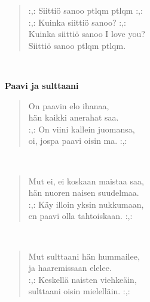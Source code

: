 \noindent\begin{minipage}{\linewidth}
\begin{verse}
	\hspace{0pt-\widthof{:,: }}:,: Siittiö sanoo ptlqm ptlqm :,:\\
	\hspace{0pt-\widthof{:,: }}:,: Kuinka siittiö sanoo? :,:\\
	Kuinka siittiö sanoo I love you?\\
	Siittiö sanoo ptlqm ptlqm.\\
\end{verse}
\end{minipage}\\[10pt]
%
%
\noindent\begin{minipage}{\linewidth}
\vspace{5pt}
\parbox[t]{0.85\linewidth}{\raggedright {\large\bf Paavi ja sulttaani}\\[6pt]}
\begin{verse}
	On paavin elo ihanaa,\\
	hän kaikki anerahat saa.\\
	\hspace{0pt-\widthof{:,: }}:,: On viini kallein juomansa,\\
	oi, jospa paavi oisin ma. :,:\\
\end{verse}
\end{minipage}\\[10pt]
\noindent\begin{minipage}{\linewidth}
\begin{verse}
	Mut ei, ei koskaan maistaa saa,\\
	hän nuoren naisen suudelmaa.\\
	\hspace{0pt-\widthof{:,: }}:,: Käy illoin yksin nukkumaan,\\
	en paavi olla tahtoiskaan. :,:\\
\end{verse}
\end{minipage}\\[10pt]
\noindent\begin{minipage}{\linewidth}
\begin{verse}
	Mut sulttaani hän hummailee,\\
	ja haaremissaan elelee.\\
	\hspace{0pt-\widthof{:,: }}:,: Keskellä naisten viehkeäin,\\
	sulttaani oisin mielelläin. :,:\\
\end{verse}
\end{minipage}\\[10pt]
